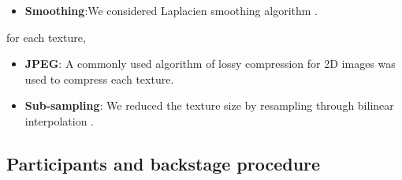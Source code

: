 \begin{itemize}
\item \textbf{Smoothing}:We considered Laplacien smoothing algorithm \cite{Steinbrecher_2008}.
\end{itemize}
for each texture,
\begin{itemize}
\item \textbf{JPEG}: A commonly used algorithm of lossy compression for 2D images was used to compress each texture.
\end{itemize}
\begin{itemize}
\item \textbf{Sub-sampling}: We reduced the texture size by resampling through bilinear interpolation .
\end{itemize}
\subsection{Participants and backstage procedure}



